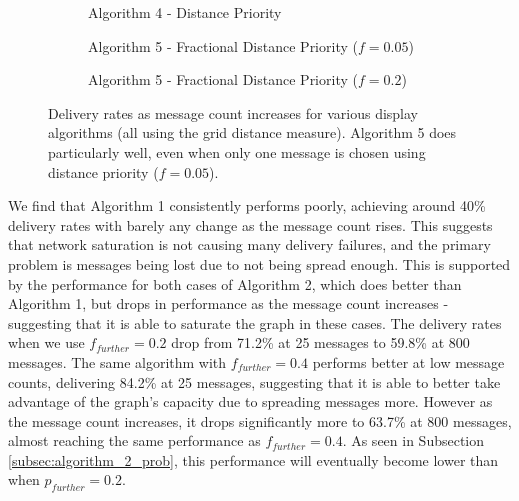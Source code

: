 \documentclass[bsc,frontabs,twoside,singlespacing,parskip,deptreport]{infthesis}     %
\begin{document}
\begin{figure}
\begin{subfigure}[t]{0.49\textwidth}
\begin{tikzpicture}
\end{tikzpicture}
\caption{Algorithm 4 - Distance Priority}
\end{subfigure}
%
\par\bigskip 
%
\begin{subfigure}[t]{0.49\textwidth}
\captionsetup{justification=centering}
\caption{Algorithm 5 - Fractional Distance Priority ($f=0.05$)}
\end{subfigure}
%
\begin{subfigure}[t]{0.49\textwidth}
\captionsetup{justification=centering}
\caption{Algorithm 5 - Fractional Distance Priority ($f=0.2$)}
\end{subfigure}
\caption{Delivery rates as message count increases for various display algorithms (all using the grid distance measure). Algorithm 5 does particularly well, even when only one message is chosen using distance priority ($f=0.05$).}
\label{fig:all_show_models}
\end{figure}

We find that Algorithm 1 consistently performs poorly, achieving around 40\% delivery rates with barely any change as the message count rises. This suggests that network saturation is not causing many delivery failures, and the primary problem is messages being lost due to not being spread enough. This is supported by the performance for both cases of Algorithm 2, which does better than Algorithm 1, but drops in performance as the message count increases - suggesting that it is able to saturate the graph in these cases. The delivery rates when we use $f_{further}=0.2$ drop from 71.2\% at 25 messages to 59.8\% at 800 messages. The same algorithm with $f_{further}=0.4$ performs better at low message counts, delivering 84.2\% at 25 messages, suggesting that it is able to better take advantage of the graph's capacity due to spreading messages more. However as the message count increases, it drops significantly more to 63.7\% at 800 messages, almost reaching the same performance as $f_{further}=0.4$. As seen in Subsection \ref{subsec:algorithm_2_prob}, this performance will eventually become lower than when $p_{further}=0.2$.
\end{document}
